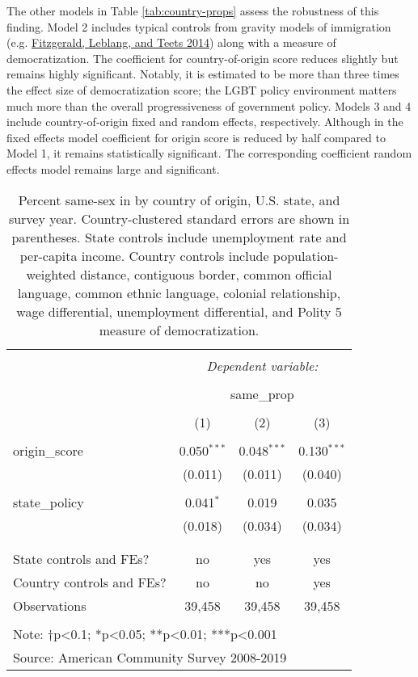 \documentclass[
  11pt,
]{article}
\begin{document}
The other models in Table \ref{tab:country-props} assess the robustness of this finding. Model 2 includes typical controls from gravity models of immigration (e.g. \protect\hyperlink{ref-fitzgerald_2014}{Fitzgerald, Leblang, and Teets 2014}) along with a measure of democratization. The coefficient for country-of-origin score reduces slightly but remains highly significant. Notably, it is estimated to be more than three times the effect size of democratization score; the LGBT policy environment matters much more than the overall progressiveness of government policy. Models 3 and 4 include country-of-origin fixed and random effects, respectively. Although in the fixed effects model coefficient for origin score is reduced by half compared to Model 1, it remains statistically significant. The corresponding coefficient random effects model remains large and significant.

\begin{table}[!htbp] \centering 
  \caption{Percent same-sex in by country of origin, U.S. state, and survey year. Country-clustered standard errors are shown in parentheses. State controls include unemployment rate and per-capita income. Country controls include population-weighted distance, contiguous border, common official language, common ethnic language, colonial relationship, wage differential, unemployment differential, and Polity 5 measure of democratization.} 
  \label{tab:state-props} 
\begin{tabular}{@{\extracolsep{5pt}}lccc} 
\\[-1.8ex]\hline 
\hline \\[-1.8ex] 
 & \multicolumn{3}{c}{\textit{Dependent variable:}} \\ 
\cline{2-4} 
\\[-1.8ex] & \multicolumn{3}{c}{same\_prop} \\ 
\\[-1.8ex] & (1) & (2) & (3)\\ 
\hline \\[-1.8ex] 
 origin\_score & 0.050$^{***}$ & 0.048$^{***}$ & 0.130$^{***}$ \\ 
  & (0.011) & (0.011) & (0.040) \\ 
  & & & \\ 
 state\_policy & 0.041$^{*}$ & 0.019 & 0.035 \\ 
  & (0.018) & (0.034) & (0.034) \\ 
  & & & \\ 
\hline \\[-1.8ex] 
State controls and FEs? & no & yes & yes \\ 
Country controls and FEs? & no & no & yes \\ 
Observations & 39,458 & 39,458 & 39,458 \\ 
\hline 
\hline \\[-1.8ex] 
\multicolumn{4}{l}{Note: †p<0.1; *p<0.05; **p<0.01; ***p<0.001} \\ 
\multicolumn{4}{l}{Source: American Community Survey 2008-2019} \\ 
\end{tabular} 
\end{table}
\end{document}
